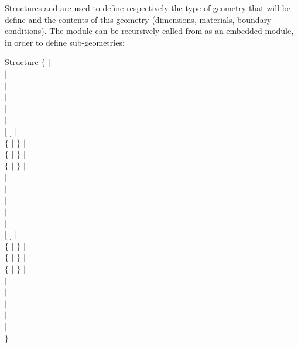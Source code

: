 Structures  and  are used to define respectively
the type of geometry that will be define and the contents of this geometry
(dimensions, materials, boundary conditions). The module  can be
recursively called from 
 as an embedded module, in order to define sub-geometries:

\begin{DataStructure}{Structure }
$\{$  $|$ \\
 $|$\\
  $|$ \\
  $|$ \\
   $|$\\ 
    $|$  \\
  $[$   $]$  $|$\\
  $\{$  $|$    $\}$ $|$\\ 
  $\{$  $|$    $\}$ $|$\\
  $\{$  $|$    $\}$ $|$ \\
   $|$ \\
  $|$ \\
   $|$ \\
  $|$ \\
   $|$ \\
  $[$   $]$ $|$\\
  $\{$  $|$    $\}$ $|$ \\
  $\{$  $|$    $\}$ $|$ \\ 
  $\{$  $|$    $\}$ $|$ \\
  $|$ \\
   $|$ \\
  $|$ \\
    $|$ \\
  $|$ \\
  $\}$
\end{DataStructure}

